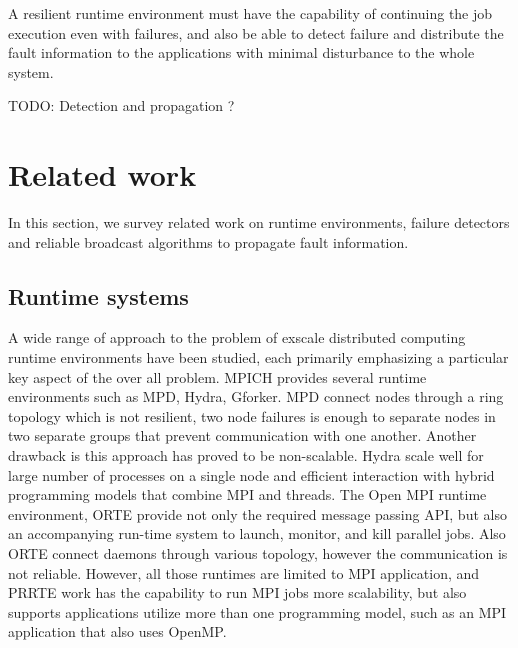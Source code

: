 \documentclass[sigconf]{acmart}
\begin{document}
A resilient runtime environment must have the capability of continuing the job execution even with failures, and also be able to detect failure and distribute the fault information to the applications with minimal disturbance to the whole system.  

TODO:
Detection and propagation ?

\section{Related work}
In this section, we survey related work on runtime environments, failure detectors and reliable broadcast algorithms to propagate fault information.

\subsection{Runtime systems}
A wide range of approach to the problem of exscale distributed computing runtime environments have been studied, each primarily emphasizing a particular key aspect of the over all problem. MPICH provides several runtime environments such as MPD\cite{Butler00}, Hydra\cite{MPICH14}, Gforker. MPD connect nodes through a ring topology which is not resilient, two node failures is enough to separate nodes in two separate groups that prevent communication with one another. Another drawback is this approach has proved to be non-scalable. Hydra scale well for large number of processes on a single node and efficient interaction with hybrid programming models that combine MPI and threads. The Open MPI runtime environment, ORTE\cite{Castain05}\cite{Jeffrey12} provide not only the required message passing API, but also an accompanying run-time system to launch, monitor, and kill parallel jobs. Also ORTE connect daemons through various topology, however the communication is not reliable. However, all those runtimes are limited to MPI application, and PRRTE work has the capability to run MPI jobs more scalability, but also supports applications utilize more than one programming model, such as an MPI application that also uses OpenMP. 
\end{document}
